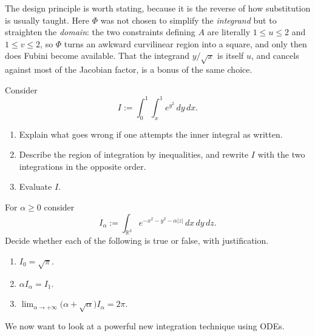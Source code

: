 \begin{ainote}
The design principle is worth stating, because it is the reverse of how substitution is usually
taught. Here $\Phi$ was not chosen to simplify the \emph{integrand} but to straighten the
\emph{domain}: the two constraints defining $A$ are literally $1 \leq u \leq 2$ and
$1 \leq v \leq 2$, so $\Phi$ turns an awkward curvilinear region into a square, and only then
does Fubini become available. That the integrand $y/\sqrt x$ is itself $u$, and cancels against
most of the Jacobian factor, is a bonus of the same choice.
\end{ainote}

\begin{aiexercise}
\label{ex:ai_order_swap_gaussian}
Consider
\[I := \int_0^1\!\!\int_x^1 e^{y^2}\,dy\,dx.\]
\begin{enumerate}[label=\textbf{(\alph*)}]
  \item Explain what goes wrong if one attempts the inner integral as written.
  \item Describe the region of integration by inequalities, and rewrite $I$ with the two
    integrations in the opposite order.
  \item Evaluate $I$.
\end{enumerate}
\end{aiexercise}

\begin{exercise}[True or False \textnormal{(a Gaussian slab, and what happens at $\alpha=0$)}]
\label{ex:gaussian_slab_alpha_asymptotics}
For $\alpha \geq 0$ consider
\[I_\alpha := \int_{\mathbb{R}^3} e^{-x^2-y^2-\alpha\lvert z\rvert}\,dx\,dy\,dz .\]
Decide whether each of the following is true or false, with justification.
\begin{enumerate}[label=\textbf{(\alph*)}]
  \item $I_0 = \sqrt{\pi}$.
  \item $\alpha I_\alpha = I_1$.
  \item $\displaystyle\lim_{\alpha\to+\infty}\big(\alpha+\sqrt{\alpha}\big)I_\alpha = 2\pi$.
\end{enumerate}
\end{exercise}

We now want to look at a powerful new integration technique using ODEs.
